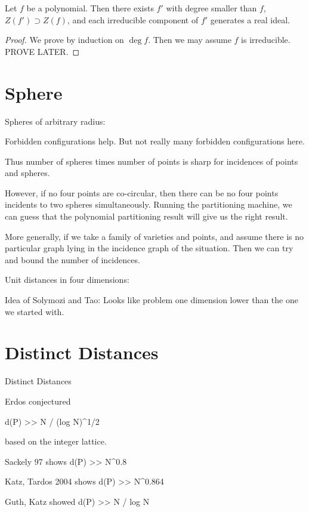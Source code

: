 \begin{lemma}
    Let $f$ be a polynomial. Then there exists $f'$ with degree smaller than $f$, $Z(f') \supset Z(f)$, and each irreducible component of $f'$ generates a real ideal.
\end{lemma}
\begin{proof}
    We prove by induction on $\deg f$. Then we may assume $f$ is irreducible. PROVE LATER.
\end{proof}


\chapter{Sphere}

Spheres of arbitrary radius:

Forbidden configurations help. But not really many forbidden configurations here.

Thus number of spheres times number of points is sharp for incidences of points and spheres.

However, if no four points are co-circular, then there can be no four points incidents to two spheres simultaneously. Running the partitioning machine, we can guess that the polynomial partitioning result will give us the right result.

More generally, if we take a family of varieties and points, and assume there is no particular graph lying in the incidence graph of the situation. Then we can try and bound the number of incidences.

Unit distances in four dimensions:

Idea of Solymozi and Tao: Looks like problem one dimension lower than the one we started with.




\chapter{Distinct Distances}

Distinct Distances

Erdos conjectured

	d(P) >> N / (log N)^{1/2}

based on the integer lattice.


Sackely 97 shows d(P) >> N^{0.8}

Katz, Tardos 2004 shows d(P) >> N^{0.864}

Guth, Katz showed d(P) >> N / log N


